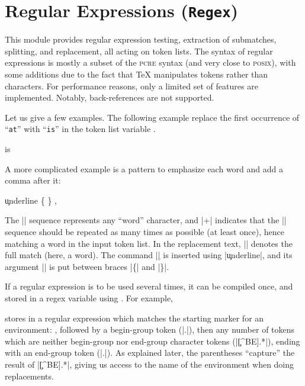 \documentclass[oneside]{book}
\begin{document}
\chapter{Regular Expressions (\texttt{Regex})}

This module provides regular expression testing,
extraction of submatches, splitting, and replacement, all acting
on token lists. The syntax of regular expressions is mostly a subset
of the \textsc{pcre} syntax (and very close to \textsc{posix}),
with some additions
due to the fact that \TeX{} manipulates tokens rather than characters.
For performance reasons, only a limited set of features are implemented.
Notably, back-references are not supported.

Let us give a few examples. The following example replace the first
occurrence of \enquote{\texttt{at}} with \enquote{\texttt{is}}
in the token list variable .
\begin{demohigh}
\tlSet {}
 {is} \lTmpaTl
\tlUse \lTmpaTl
\end{demohigh}
A more complicated example is
a pattern to emphasize each word and add a comma after it:
\begin{demohigh}
\tlSet {}
\regexReplaceAll {\w+} {\c{underline} \cB\{ \0 \cE\} ,} \lTmpaTl
\tlUse \lTmpaTl
\end{demohigh}
The |\w| sequence represents any \enquote{word} character, and |+|
indicates that the |\w| sequence should be repeated as many times as
possible (at least once), hence matching a word in the input token
list. In the replacement text, |\0| denotes the full match (here, a
word).  The command |\underline| is inserted using |\c{underline}|,
and its argument |\0| is put between braces |\cB\{| and |\cE\}|.

If a regular expression is to be used several times,
it can be compiled once, and stored in a regex
variable using . For example,
\begin{codehigh}
\regexNew \lFooRegex
\regexSet {}
\end{codehigh}
stores in  a regular expression which matches the
starting marker for an environment: , followed by a
begin-group token (|\cB.|), then any number of tokens which are
neither begin-group nor end-group character tokens (|\c[^BE].*|),
ending with an end-group token (|\cE.|). As explained later,
the parentheses \enquote{capture} the result of |\c[^BE].*|,
giving us access to the name of the environment when doing
replacements.
\end{document}
